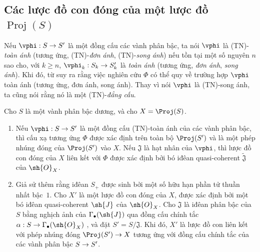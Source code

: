 \documentclass[oneside,10pt]{amsart}
\makeatletter
\renewcommand{\geq}{\geqslant}
\newcommand{\ega@arrow}[2]{\mathchoice{#1}{#2}{#2}{#2}}
\renewcommand{\to}{\ega@arrow{\longrightarrow}{\rightarrow}}
\let\EGAOriginalLabel\label
\renewcommand{\label}[1]{\phantomsection\EGAOriginalLabel{#1}}
\makeatother
\begin{document}
\subsection{Các lược đồ con đóng của một lược đồ $\operatorname{Proj}(S)$}
\label{subsection:II.2.9}

\begin{env}[2.9.1]
\label{II.2.9.1}
Nếu $\vphi:S\to S'$ là một đồng cấu các vành phân bậc, ta nói $\vphi$ là (TN)-\emph{toàn ánh} (tương ứng, (TN)-\emph{đơn ánh}, (TN)-\emph{song ánh}) nếu tồn tại một số nguyên $n$ sao cho, với $k\geq n$, $\vphi_k:S_k\to S'_k$ là \emph{toàn ánh} (tương ứng, \emph{đơn ánh}, \emph{song ánh}).
Khi đó, từ  suy ra rằng việc nghiên cứu $\Phi$ có thể quy về trường hợp $\vphi$ toàn ánh (tương ứng, đơn ánh, song ánh).
Thay vì nói $\vphi$ là (TN)-song ánh, ta cũng nói rằng nó là một (TN)-\emph{đẳng cấu}.
\end{env}

\begin{proposition}[2.9.2]
\label{II.2.9.2}
Cho $S$ là một vành phân bậc dương, và cho $X=\Proj(S)$.
\begin{enumerate}
  \item[{\rm(i)}] Nếu $\vphi:S\to S'$ là một đồng cấu (TN)-toàn ánh của các vành phân bậc, thì cấu xạ tương ứng $\Phi$  được xác định trên toàn bộ $\Proj(S')$ và là một phép nhúng đóng của $\Proj(S')$ vào $X$.
    Nếu $\mathfrak{J}$ là hạt nhân của $\vphi$, thì lược đồ con đóng của $X$ liên kết với $\Phi$ được xác định bởi bó iđêan quasi-coherent $\widetilde{\mathfrak{J}}$ của $\sh{O}_X$.
  \item[{\rm(ii)}] Giả sử thêm rằng iđêan $S_+$ được sinh bởi một số hữu hạn phần tử thuần nhất bậc~$1$.
    Cho $X'$ là một lược đồ con đóng của $X$, được xác định bởi một bó iđêan quasi-coherent $\sh{J}$ của $\sh{O}_X$.
    Cho $\mathfrak{J}$ là iđêan phân bậc của $S$ bằng nghịch ảnh của $\Gamma_\bullet(\sh{J})$ qua đồng cấu chính tắc $\alpha:S\to\Gamma_\bullet(\sh{O}_X)$ , và đặt $S'=S/\mathfrak{J}$.
    Khi đó, $X'$ là lược đồ con liên kết với phép nhúng đóng $\Proj(S')\to X$ tương ứng với đồng cấu chính tắc của các vành phân bậc $S\to S'$.
\end{enumerate}
\end{proposition}
\end{document}
